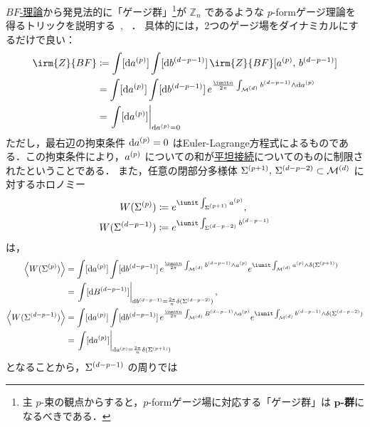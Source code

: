 \documentclass[TQFT_main]{subfiles}
\begin{document}
\hyperref[def:BF]{$BF$-理論}から発見法的に「ゲージ群」\footnote{主 $p$-束の観点からすると，$p$-formゲージ場に対応する「ゲージ群」は $\bm{p}$\textbf{-群}になるべきである．}が $\mathbb{Z}_n$ であるような $p$-formゲージ理論を得るトリックを説明する~\cite[p.6]{BanksSeiberg2011symmetry}, ~\cite[p.9]{KapustinSeiberg2014}．
具体的には，2つのゲージ場をダイナミカルにするだけで良い：
\begin{align}
    \irm{Z}{BF} 
    &\coloneqq \int [\dd{\hg{a}{p}}] \int [\dd{\hg{b}{d-p-1}}]\, \irm{Z}{BF}[\hg{a}{p},\, \hg{b}{d-p-1}] \\
    &= \int [\dd{\hg{a}{p}}] \int [\dd{\hg{b}{d-p-1}}]\, e^{\frac{\iunit n}{2\pi} \int_{\mfdcal{M}{d}} \hg{b}{d-p-1} \wedge \dd{\hg{a}{p}}} \\
    &= \eval{\int [\dd{\hg{a}{p}}]}_{\dd{\hg{a}{p}} = 0}
\end{align}
ただし，最右辺の拘束条件 $\dd{a^{(p)}} = 0$ はEuler-Lagrange方程式によるものである．この拘束条件により，$a^{(p)}$ についての和が\hyperref[def:flat-connection-homotopy]{平坦接続}についてのものに制限されたということである．
また，任意の閉部分多様体 $\Sigma^{(p+1)},\, \Sigma^{(d-p-2)} \subset \mathcal{M}^{(d)}$ に対するホロノミー
\begin{align}
    W (\mfd{\Sigma}{p}) &\coloneqq e^{\iunit \int_{\mfd{\Sigma}{p+1}} \hg{a}{p}}, \\
    W (\mfd{\Sigma}{d-p-1}) &\coloneqq e^{\iunit \int_{\mfd{\Sigma}{d-p-2}} \hg{b}{d-p-1}}
\end{align}
は，
\begin{align}
    \expval{W (\mfd{\Sigma}{p})}
    &= \int [\dd{\hg{a}{p}}] \int [\dd{\hg{b}{d-p-1}}]\, e^{\frac{\iunit n}{2\pi} \int_{\mfdcal{M}{d}} \hg{b}{d-p-1} \wedge \hg{a}{p}} e^{\iunit \int_{\mfdcal{M}{d}} \hg{a}{p} \wedge \delta(\mfd{\Sigma}{p+1})} \\
    &= \eval{\int [\dd{\hg{B}{d-p-1}}]}_{\dd{\hg{b}{d-p-1}} = \frac{2\pi}{n} \delta(\mfd{\Sigma}{d-p-2})},\\
    \expval{W (\mfd{\Sigma}{d-p-1})}
    &= \int [\dd{\hg{a}{p}}] \int [\dd{\hg{b}{d-p-1}}]\, e^{\frac{\iunit n}{2\pi} \int_{\mfdcal{M}{d}} \hg{B}{d-p-1} \wedge \hg{a}{p}} e^{\iunit \int_{\mfdcal{M}{d}} \hg{b}{d-p-1} \wedge \delta(\mfd{\Sigma}{d-p-2})} \\
    &= \eval{\int [\dd{\hg{a}{p}}]}_{\dd{\hg{a}{p}} = \frac{2\pi}{n} \delta(\mfd{\Sigma}{p+1})} 
\end{align}
となることから，$\Sigma^{(d-p-1)}$ の周りでは
\end{document}
